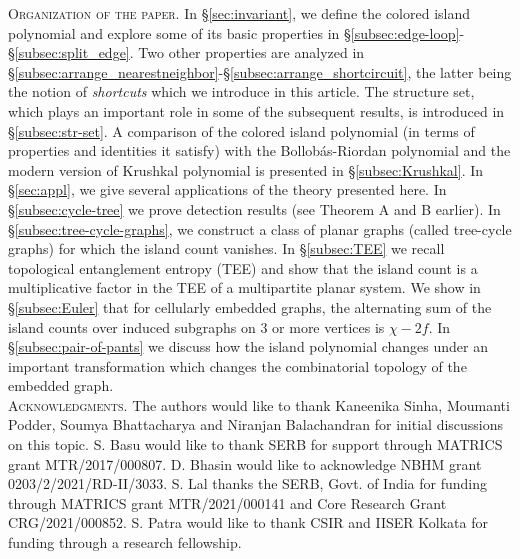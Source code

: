\documentclass[10pt, reqno]{amsart}
\theoremstyle{plain}
\theoremstyle{remark}
\theoremstyle{definition}
\numberwithin{equation}{section}
\begin{document}
\noindent \textsc{Organization of the paper}. In \S \ref{sec:invariant}, we define the colored island polynomial and explore some of its basic properties in \S \ref{subsec:edge-loop}-\S \ref{subsec:split_edge}. Two other properties are analyzed in \S \ref{subsec:arrange_nearestneighbor}-\S \ref{subsec:arrange_shortcircuit}, the latter being the notion of {\it shortcuts} which we introduce in this article. The structure set, which plays an important role in some of the subsequent results, is introduced in \S \ref{subsec:str-set}. A comparison of the colored island polynomial (in terms of properties and identities it satisfy) with the Bollob\'{a}s-Riordan polynomial and the modern version of Krushkal polynomial is presented in \S \ref{subsec:Krushkal}. In \S \ref{sec:appl}, we give several applications of the theory presented here. In \S \ref{subsec:cycle-tree} we prove detection results (see Theorem A and B earlier). In \S \ref{subsec:tree-cycle-graphs}, we construct a class of planar graphs (called tree-cycle graphs) for which the island count vanishes. In \S \ref{subsec:TEE} we recall topological entanglement entropy (TEE) and show that the island count is a multiplicative factor in the TEE of a multipartite planar system. We show in \S \ref{subsec:Euler} that for cellularly embedded graphs, the alternating sum of the island counts over induced subgraphs on $3$ or more vertices is $\chi-2f$. In \S \ref{subsec:pair-of-pants} we discuss how the island polynomial changes under an important transformation which changes the combinatorial topology of the embedded graph.\\[-0.2cm]
	
\noindent \textsc{Acknowledgments.} The authors would like to thank Kaneenika Sinha, Moumanti Podder, Soumya Bhattacharya and Niranjan Balachandran for initial discussions on this topic. S. Basu would like to thank SERB for support through MATRICS grant MTR/2017/000807. D. Bhasin would like to acknowledge NBHM grant 0203/2/2021/RD-II/3033. S. Lal thanks the SERB, Govt.
of India for funding through MATRICS grant MTR/2021/000141 and Core Research Grant CRG/2021/000852. S. Patra would like to thank CSIR and IISER Kolkata for funding through a research fellowship.\\



\end{document}
